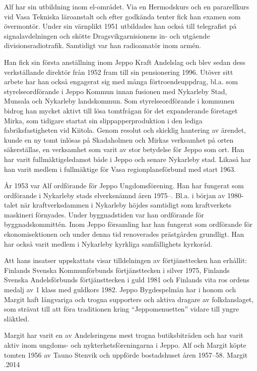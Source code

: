 Alf har sin utbildning inom el-området. Via en Hermodskurs och en pararellkurs vid Vasa Tekniska läroanstalt och efter godkända tenter fick han examen som övermontör. Under sin värnplikt 1951 utbildades han också till telegrafist på signalavdelningen och skötte Dragsvikgarnisionens in- och utgående divisionsradiotrafik. Samtidigt var han radioamatör inom armén.

Han fick sin första anställning inom Jeppo Kraft Andelslag och blev sedan dess verkställande direktör från 1952  fram till sin pensionering 1996. Utöver sitt arbete har han också engagerat sig med många förtroendeuppdrag, bl.a. som styrelseordförande i Jeppo Kommun innan fusionen med Nykarleby Stad, Munsala och Nykarleby landskommun. Som styrelseordförande i kommunen bidrog han mycket aktivt till lösa tomtfrågan för det expanderande företaget Mirka, som tidigare startat sin slippapperproduktion i den lediga fabriksfastigheten vid Kiitola. Genom resolut och skicklig hantering av ärendet, kunde en ny tomt inlösas på Skadaholmen och Mirkas verksamhet på orten säkerställas, en verksamhet som varit av stor betydelse för Jeppo som ort. Han har varit fullmäktigeledamot både i Jeppo och senare Nykarleby stad. Likaså har han varit  medlem i fullmäktige för Vasa regionplaneförbund med start 1963.

År 1953 var Alf ordförande för Jeppo Ungdomsförening. Han har fungerat som ordförande i Nykarleby stads elverksnämnd åren 1975--. Bl.a. i början av 1980-talet när kraftverksdammen i Nykarleby höjdes samtidigt som kraftverkets maskineri förnyades. Under byggnadstiden var han ordförande för byggnadskommittén. Inom Jeppo församling har han fungerat som ordförande för ekonomisektionen och under denna tid renoverades prästgården grundligt. Han har också varit medlem i Nykarleby kyrkliga samfällighets kyrkoråd.

Att hans insatser uppskattats visar tilldelningen av förtjänsttecken han erhållit: Finlands Svenska Kommunförbunds förtjänsttecken i silver 1975, Finlands Svenska Andelsförbunds förtjänsttecken i guld 1981 och Finlands vita ros ordens medalj av 1 klass med guldkors 1982. Jeppo Bygdespelmän har i honom och Margit haft långvariga och trogna supporters och aktiva dragare av folkdanslaget, som strävat till att föra traditionen kring ``Jeppomenuetten'' vidare till yngre släktled.

Margit har varit en av Andelsringens mest trogna butiksbiträden och har varit aktiv inom ungdoms- och nykterhetsföreningarna i Jeppo. Alf och Margit köpte tomten 1956 av Tauno Stenvik och uppförde bostadshuset åren 1957--58.
Margit .2014



